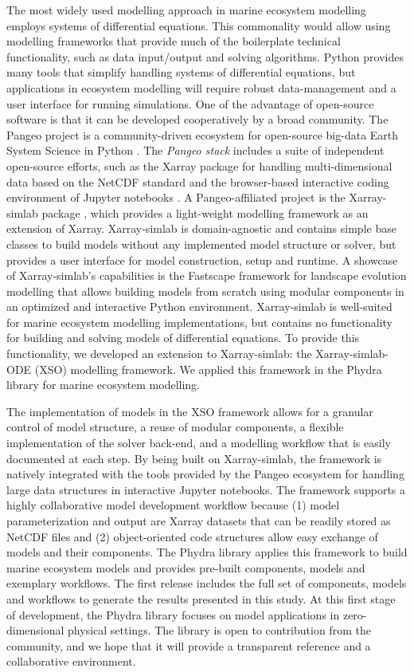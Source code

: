 \documentclass[journal abbreviation, manuscript]{copernicus}
\begin{document}
The most widely used modelling approach in marine ecosystem modelling employs systems of differential equations. This commonality would allow using modelling frameworks that provide much of the boilerplate technical functionality, such as data input/output and solving algorithms. Python provides many tools that simplify handling systems of differential equations, but applications in ecosystem modelling will require robust data-management and a user interface for running simulations. One of the advantage of open-source software is that it can be developed cooperatively by a broad community. The Pangeo project is a community-driven ecosystem for open-source big-data Earth System Science in Python \citep{Eynard-Bontemps2019TheCNES}. The \textit{Pangeo stack} includes a suite of independent open-source efforts, such as the Xarray package \citep{Hoyer2017Xarray:Python} for handling multi-dimensional data based on the NetCDF standard and the browser-based interactive coding environment of Jupyter notebooks \citep{Kluyver2016JupyterWorkflows}. A Pangeo-affiliated project is the Xarray-simlab package \citep{Bovy2018Xarray-simlab:Interactively}, which provides a light-weight modelling framework as an extension of Xarray. Xarray-simlab is domain-agnostic and contains simple base classes to build models without any implemented model structure or solver, but provides a user interface for model construction, setup and runtime. A showcase of Xarray-simlab's capabilities is the Fastscape framework for landscape evolution modelling \citep{benoit_bovy_2020_3840917} that allows building models from scratch using modular components in an optimized and interactive Python environment. Xarray-simlab is well-suited for marine ecosystem modelling implementations, but contains no functionality for building and solving models of differential equations. To provide this functionality, we developed an extension to Xarray-simlab: the Xarray-simlab-ODE (XSO) modelling framework. We applied this framework in the Phydra library for marine ecosystem modelling. 

The implementation of models in the XSO framework allows for a granular control of model structure, a reuse of modular components, a flexible implementation of the solver back-end, and a modelling workflow that is easily documented at each step. By being built on Xarray-simlab, the framework is natively integrated with the tools provided by the Pangeo ecosystem for handling large data structures in interactive Jupyter notebooks. The framework supports a highly collaborative model development workflow because (1) model parameterization and output are Xarray datasets that can be readily stored as NetCDF files and (2) object-oriented code structures allow easy exchange of models and their components. The Phydra library applies this framework to build marine ecosystem models and provides pre-built components, models and exemplary workflows. The first release includes the full set of components, models and workflows to generate the results presented in this study. At this first stage of development, the Phydra library focuses on model applications in zero-dimensional physical settings. The library is open to contribution from the community, and we hope that it will provide a transparent reference and a collaborative environment. 
\end{document}
